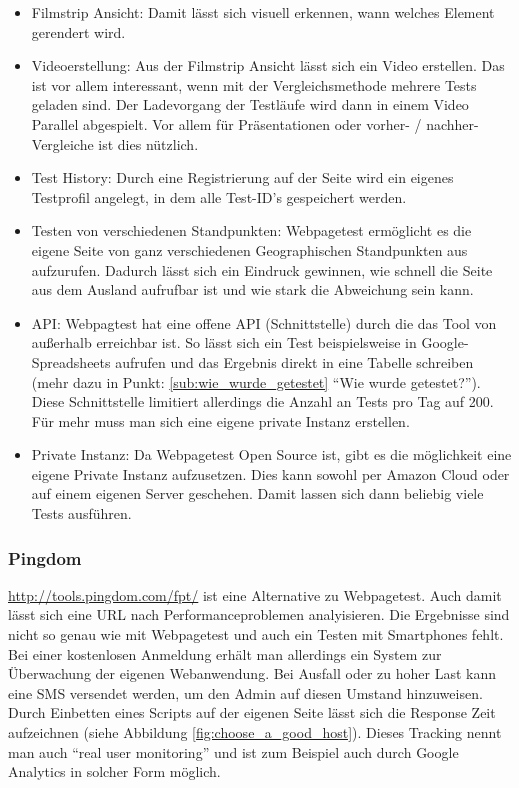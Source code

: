 \begin{itemize}
				\item Filmstrip Ansicht: Damit lässt sich visuell erkennen, wann welches Element gerendert wird.

				\item Videoerstellung: Aus der Filmstrip Ansicht lässt sich ein Video erstellen. Das ist vor allem interessant, wenn mit der Vergleichsmethode mehrere Tests geladen sind. Der Ladevorgang der Testläufe wird dann in einem Video Parallel abgespielt. Vor allem für Präsentationen oder vorher- / nachher-Vergleiche ist dies nützlich.

				\item Test History: Durch eine Registrierung auf der Seite wird ein eigenes Testprofil angelegt, in dem alle Test-ID's gespeichert werden.

				\item Testen von verschiedenen Standpunkten: Webpagetest ermöglicht es die eigene Seite von ganz verschiedenen Geographischen Standpunkten aus aufzurufen. Dadurch lässt sich ein Eindruck gewinnen, wie schnell die Seite aus dem Ausland aufrufbar ist und wie stark die Abweichung sein kann.

				\item API: Webpagtest hat eine offene API (Schnittstelle) durch die das Tool von außerhalb erreichbar ist. So lässt sich ein Test beispielsweise in Google-Spreadsheets aufrufen und das Ergebnis direkt in eine Tabelle schreiben (mehr dazu in Punkt: \ref{sub:wie_wurde_getestet} "`Wie wurde getestet?"'). Diese Schnittstelle limitiert allerdings die Anzahl an Tests pro Tag auf 200. Für mehr muss man sich eine eigene private Instanz erstellen. 

				\item Private Instanz: Da Webpagetest Open Source ist, gibt es die möglichkeit eine eigene Private Instanz aufzusetzen. Dies kann sowohl per Amazon Cloud oder auf einem eigenen Server geschehen. Damit lassen sich dann beliebig viele Tests ausführen.

			\end{itemize}


		\subsubsection{Pingdom} %
		\label{ssub:pingdom}
			\url{http://tools.pingdom.com/fpt/} ist eine Alternative zu Webpagetest. Auch damit lässt sich eine URL nach Performanceproblemen analyisieren. Die Ergebnisse sind nicht so genau wie mit Webpagetest und auch ein Testen mit Smartphones fehlt. Bei einer kostenlosen Anmeldung erhält man allerdings ein System zur Überwachung der eigenen Webanwendung. Bei Ausfall oder zu hoher Last kann eine SMS versendet werden, um den Admin auf diesen Umstand hinzuweisen. Durch Einbetten eines Scripts auf der eigenen Seite lässt sich die Response Zeit aufzeichnen (siehe Abbildung \ref{fig:choose_a_good_host}). Dieses Tracking nennt man auch "`real user monitoring"' und ist zum Beispiel auch durch Google Analytics in solcher Form möglich.
		

